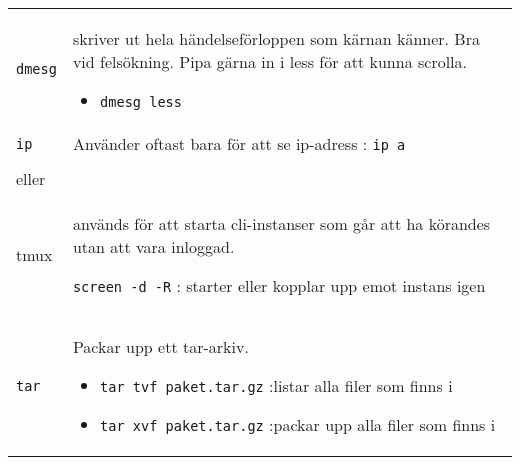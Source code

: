 \documentclass[a4paper]{article}
\begin{document}
\begin{longtable}{l|l}
\begin{minipage}[t]{0.8\textwidth}
  \end{minipage}
  \\
  \midrule
  \begin{minipage}[t]{0.2\textwidth} 
    \texttt{dmesg}
  \end{minipage}
  &
  \begin{minipage}[t]{0.8\textwidth} 
skriver ut hela h\"andelsef\"orloppen som k\"arnan k\"anner. Bra vid fels\"okning.
Pipa g\"arna in i less f\"or att kunna scrolla.

\begin{itemize}

\item
  \texttt{dmesg \textbar{} less}
\end{itemize}

  \end{minipage}
  \\
  \midrule
  \begin{minipage}[t]{0.2\textwidth} 
    \texttt{ip}
  \end{minipage}
  &
  \begin{minipage}[t]{0.8\textwidth} 
Anv\"ander oftast bara f\"or att se ip-adress : \texttt{ip a}
  \end{minipage}
  \\
  \midrule
  \begin{minipage}[t]{0.2\textwidth} 
    \texttt{screen\\eller\\tmux}
  \end{minipage}
  &
  \begin{minipage}[t]{0.8\textwidth}
    anv\"ands f\"or att starta cli-instanser som g{\aa}r att ha
    k\"orandes utan att vara inloggad.

    \texttt{screen -d -R} : starter eller kopplar upp emot instans igen

\end{minipage}
  \\
  \midrule
  \begin{minipage}[t]{0.2\textwidth} 
    \texttt{tar}
  \end{minipage}
  &
  \begin{minipage}[t]{0.8\textwidth} 
    Packar upp ett tar-arkiv.

    \begin{itemize}
    \item \texttt{tar tvf paket.tar.gz} :listar alla filer som finns i
    \item \texttt{tar xvf paket.tar.gz} :packar upp alla filer som
      finns i
    \end{itemize}
  \end{minipage}
  \\


\end{longtable}
\end{document}
